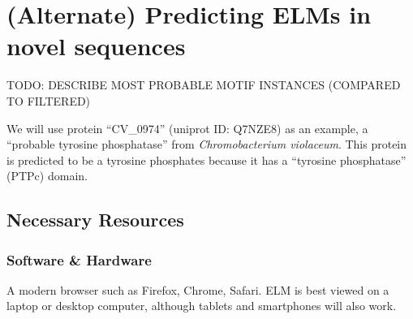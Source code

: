 \section{(Alternate) Predicting ELMs in novel sequences}
\label{sec:predicting_CV_0974}

TODO: DESCRIBE MOST PROBABLE MOTIF INSTANCES (COMPARED TO FILTERED)

We will use protein ``CV\_0974'' (uniprot ID: Q7NZE8) as an example, a
``probable tyrosine phosphatase'' from \emph{Chromobacterium violaceum}.
This protein is predicted to be a tyrosine phosphates because it has a
``tyrosine phosphatase'' (PTPc) domain.

%
%
\subsection{Necessary Resources}

\subsubsection{Software \& Hardware}

A modern browser such as Firefox, Chrome, Safari. ELM is best viewed on
a laptop or desktop computer, although tablets and smartphones will also
work.

